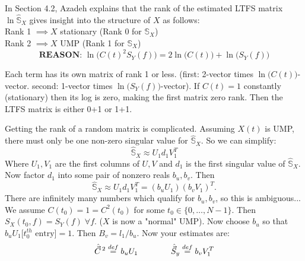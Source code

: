 In Section 4.2, Azadeh explains that the rank of the estimated LTFS matrix $\ln\hat{\mathbb S}_X$ gives insight into the structure of $X$ as follows: \\
\hspace*{100pt} Rank 1 $\implies X$ stationary (Rank 0 for $\mathbb S_X$) \\
\hspace*{100pt} Rank 2 $\implies X$ UMP (Rank 1 for $\mathbb S_X$) 
\[ \textbf{REASON: } \ln \Big(C(t)^2S_Y(f)\Big) = 2\ln\big(C(t)\big) + \ln\big(S_Y(f)\big) \]

Each term has its own matrix of rank 1 or less. (first: 2-vector times $\ln\big(C(t)\big)$-vector. second: 1-vector times $\ln\big(S_Y(f)\big)$-vector). If $C(t) = 1$ constantly (stationary) then its log is zero, making the first matrix zero rank. Then the LTFS matrix is either 0+1 or 1+1. 

Getting the rank of a random matrix is complicated. Assuming $X(t)$ is UMP, there must only be one non-zero singular value for $\hat {\mathbb S}_X$. So we can simplify:
\[ \hat {\mathbb S}_X \approx U_1 d_1 V_1^T \]
Where $U_1, V_1$ are the first columns of $U,V$ and $d_1$ is the first singular value of $\hat{\mathbb S}_X$. Now factor $d_1$ into some pair of nonzero reals $b_u, b_v$. Then \[ \hat {\mathbb S}_X \approx U_1 d_1 V_1^T = (b_uU_1)(b_vV_1)^T. \] There are infinitely many numbers which qualify for $b_u, b_v$, so this is ambiguous... We assume $C(t_0) = 1 = C^2(t_0)$ for some $t_0 \in \{0, \dots, N-1\}$. Then $S_X(t_0, f) = S_Y(f) \; \forall f$. ($X$ is now a "normal" UMP). Now choose $b_u$ so that $b_uU_1\Big[t_0^{th} \text{ entry}\Big] = 1$. Then $B_v = l_1/b_u$. Now your estimates are:
$$
\hat{\vec{C}}^{\,2} \stackrel{\small def}{=} b_uU_1 \qquad\qquad \hat{\vec S}_y \stackrel{\small def}{=} b_vV_1^T
$$
\color{black}


